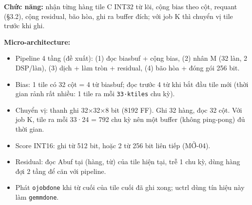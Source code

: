 \documentclass[11pt,a4paper]{article}
\renewcommand{\_}{\oldus\allowbreak}
\providecommand{\tightlist}{\setlength{\itemsep}{0pt}\setlength{\parskip}{0pt}}
\begin{document}
\textbf{Chức năng:} nhận từng hàng tile C INT32 từ lõi, cộng bias theo
cột, requant (§3.2), cộng residual, bão hòa, ghi ra buffer đích; với job
K thì chuyển vị tile trước khi ghi.

\textbf{Micro-architecture:}

\begin{itemize}
\tightlist
\item
  Pipeline 4 tầng (đề xuất): (1) đọc bias\_buf + cộng bias, (2) nhân M
  (32 làn, 2 DSP/làn), (3) dịch + làm tròn + residual, (4) bão hòa +
  đóng gói 256 bit.
\item
  Bias: 1 tile có 32 cột = 4 từ bias\_buf; đọc trước 4 từ khi bắt đầu
  tile mới (thời gian rảnh rất nhiều: 1 tile ra mỗi \texttt{33·k\_tiles}
  chu kỳ).
\item
  Chuyển vị: thanh ghi 32×32×8 bit (8192 FF). Ghi 32 hàng, đọc 32 cột.
  Với job K, tile ra mỗi 33·24 = 792 chu kỳ nên một buffer (không
  ping-pong) đủ thời gian.
\item
  Score INT16: ghi từ 512 bit, hoặc 2 từ 256 bit liên tiếp (MỞ-04).
\item
  Residual: đọc A\_buf tại (hàng, từ) của tile hiện tại, trễ 1 chu kỳ,
  dùng hàng đợi 2 tầng để căn với pipeline.
\item
  Phát \texttt{o\_job\_done} khi từ cuối của tile cuối đã ghi xong;
  u\_ctrl dùng tín hiệu này làm \texttt{gemm\_done}.
\end{itemize}
\end{document}

